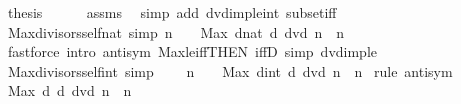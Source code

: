\begin{isabellebody}
\ {\isacharquery}{\kern0pt}thesis\isanewline
\ \ \ \ \isamarkupfalse%
\ assms\ \isamarkupfalse%
\ {\isacharparenleft}{\kern0pt}simp\ add{\isacharcolon}{\kern0pt}\ dvd{\isacharunderscore}{\kern0pt}imp{\isacharunderscore}{\kern0pt}le{\isacharunderscore}{\kern0pt}int\ subset{\isacharunderscore}{\kern0pt}iff{\isacharparenright}{\kern0pt}\isanewline
{}\isamarkupfalse%
%
\endisatagproof
{\isafoldproof}%
%
\isadelimproof
\isanewline
%
\endisadelimproof
\isanewline
{}\isamarkupfalse%
\ Max{\isacharunderscore}{\kern0pt}divisors{\isacharunderscore}{\kern0pt}self{\isacharunderscore}{\kern0pt}nat\ {\isacharbrackleft}{\kern0pt}simp{\isacharbrackright}{\kern0pt}{\isacharcolon}{\kern0pt}\ {\isachardoublequoteopen}n\ {\isasymnoteq}\ {}\ {\isasymLongrightarrow}\ Max\ {\isacharbraceleft}{\kern0pt}d{\isacharcolon}{\kern0pt}{\isacharcolon}{\kern0pt}nat{\isachardot}{\kern0pt}\ d\ dvd\ n{\isacharbraceright}{\kern0pt}\ {\isacharequal}{\kern0pt}\ n{\isachardoublequoteclose}\isanewline
%
\isadelimproof
\ \ %
\endisadelimproof
%
\isatagproof
{}\isamarkupfalse%
\ {\isacharparenleft}{\kern0pt}fastforce\ intro{\isacharcolon}{\kern0pt}\ antisym\ Max{\isacharunderscore}{\kern0pt}le{\isacharunderscore}{\kern0pt}iff{\isacharbrackleft}{\kern0pt}THEN\ iffD{}{\isacharbrackright}{\kern0pt}\ simp{\isacharcolon}{\kern0pt}\ dvd{\isacharunderscore}{\kern0pt}imp{\isacharunderscore}{\kern0pt}le{\isacharparenright}{\kern0pt}%
\endisatagproof
{\isafoldproof}%
%
\isadelimproof
\isanewline
%
\endisadelimproof
\isanewline
{}\isamarkupfalse%
\ Max{\isacharunderscore}{\kern0pt}divisors{\isacharunderscore}{\kern0pt}self{\isacharunderscore}{\kern0pt}int\ {\isacharbrackleft}{\kern0pt}simp{\isacharbrackright}{\kern0pt}{\isacharcolon}{\kern0pt}\ \isanewline
\ \ \ {\isachardoublequoteopen}n\ {\isasymnoteq}\ {}{\isachardoublequoteclose}\ \ {\isachardoublequoteopen}Max\ {\isacharbraceleft}{\kern0pt}d{\isacharcolon}{\kern0pt}{\isacharcolon}{\kern0pt}int{\isachardot}{\kern0pt}\ d\ dvd\ n{\isacharbraceright}{\kern0pt}\ {\isacharequal}{\kern0pt}\ {\isasymbar}n{\isasymbar}{\isachardoublequoteclose}\isanewline
%
\isadelimproof
%
\endisadelimproof
%
\isatagproof
{}\isamarkupfalse%
\ {\isacharparenleft}{\kern0pt}rule\ antisym{\isacharparenright}{\kern0pt}\isanewline
\ \ \isamarkupfalse%
\ {\isachardoublequoteopen}Max\ {\isacharbraceleft}{\kern0pt}d{\isachardot}{\kern0pt}\ d\ dvd\ n{\isacharbraceright}{\kern0pt}\ {\isasymle}\ {\isasymbar}n{\isasymbar}{\isachardoublequoteclose}\isanewline

\end{isabellebody}
